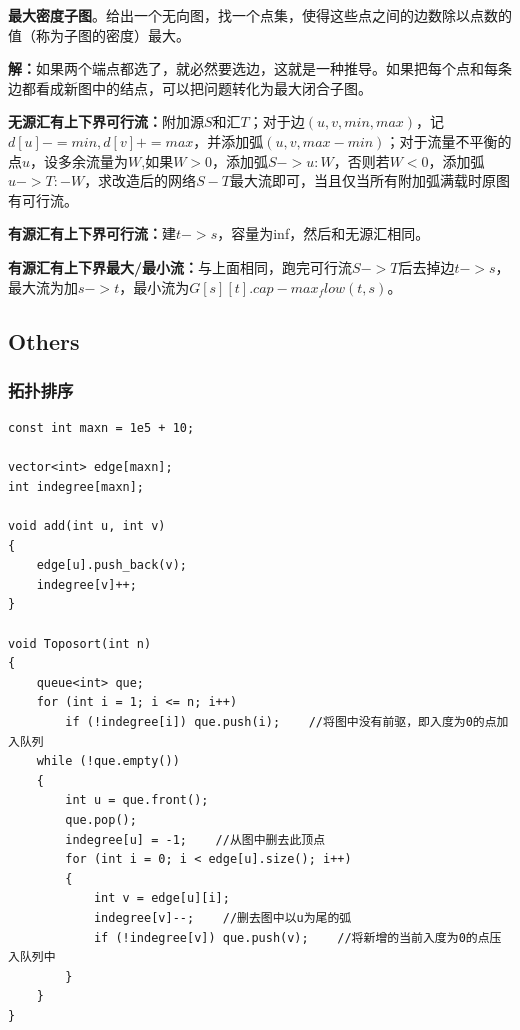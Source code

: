 \documentclass[twoside]{article}
\begin{document}
\indent

\textbf{最大密度子图}。给出一个无向图，找一个点集，使得这些点之间的边数除以点数的值（称为子图的密度）最大。

\indent

\textbf{解：}如果两个端点都选了，就必然要选边，这就是一种推导。如果把每个点和每条边都看成新图中的结点，可以把问题转化为最大闭合子图。

\indent

\textbf{无源汇有上下界可行流：}附加源$S$和汇$T$；对于边$(u, v, min, max)$，记$d[u]-=min, d[v]+=max$，并添加弧$(u, v, max - min)$；对于流量不平衡的点$u$，设多余流量为$W$,如果$W>0$，添加弧$S->u:W$，否则若$W<0$，添加弧$u->T:-W$，求改造后的网络$S-T$最大流即可，当且仅当所有附加弧满载时原图有可行流。

\indent

\textbf{有源汇有上下界可行流：}建$t->s$，容量为inf，然后和无源汇相同。

\indent

\textbf{有源汇有上下界最大/最小流：}与上面相同，跑完可行流$S->T$后去掉边$t->s$，最大流为加$s->t$，最小流为$G[s][t].cap-max_flow(t,s)$。

\subsection{Others}
\subsubsection{拓扑排序}
\begin{lstlisting}
const int maxn = 1e5 + 10;

vector<int> edge[maxn];
int indegree[maxn];

void add(int u, int v)
{
    edge[u].push_back(v);
    indegree[v]++;
}

void Toposort(int n)
{
    queue<int> que;
    for (int i = 1; i <= n; i++)
        if (!indegree[i]) que.push(i);    //将图中没有前驱，即入度为0的点加入队列
    while (!que.empty())
    {
        int u = que.front();
        que.pop();
        indegree[u] = -1;    //从图中删去此顶点	
        for (int i = 0; i < edge[u].size(); i++)
        {
            int v = edge[u][i];
            indegree[v]--;    //删去图中以u为尾的弧
            if (!indegree[v]) que.push(v);    //将新增的当前入度为0的点压入队列中
        }
    }
}\end{lstlisting}
\end{document}
